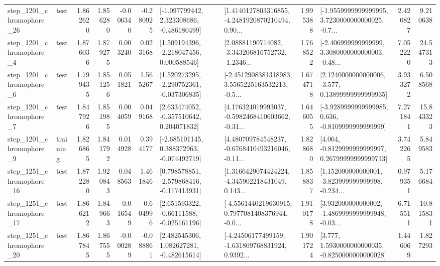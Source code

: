 \begin{tabular}{llrrrrllrlrr}
 step\_1201\_chromophore\_26 &      test &      1.862620 &    1.856280 &     -0.006340 & -0.280925 &   [-1.097799442, 2.323308686, -0.486180499] &  [1.4140127803316855, -4.2481920870210494, 0.90... &       1.995388 &  [-1.9559999999999995, 3.7230000000000025, -0.7... &            2.420827 &          9.210638 \\
  step\_1201\_chromophore\_4 &      test &      1.876036 &    1.879275 &      0.003240 &  0.023168 &    [1.509194396, -2.218047456, 0.000588546] &  [2.08881190714082, -3.343206816752732, -1.2346... &       1.768522 &  [-2.406999999999999, 3.3080000000000003, -0.48... &            7.052220 &         24.547313 \\
  step\_1201\_chromophore\_6 &      test &      1.799435 &    1.851256 &      0.051821 &  1.565267 &   [1.520273295, -2.290752361, -0.037306835] &  [-2.4512908381318983, 3.5565225163532213, -0.5... &       1.674718 &  [2.1240000000000006, -3.577, 0.13899999999999935] &            3.933272 &          6.508568 \\
  step\_1201\_chromophore\_7 &      test &      1.847926 &    1.851985 &      0.004059 &  0.049168 &    [2.633474052, -0.357510642, 0.204071832] &  [4.176324019993037, -0.5982468410603662, -0.31... &       1.646055 &  [-3.9289999999999985, 0.636, -0.8109999999999999] &            7.271841 &         15.843323 \\
  step\_1201\_chromophore\_9 &  training &      1.826865 &    1.841792 &      0.014928 &  0.394177 &   [-2.685101145, 0.388372963, -0.074492719] &  [4.480709784548237, -0.6768410493216046, -0.11... &       1.828680 &  [4.064, -0.8129999999999997, 0.26799999999999713] &            3.742265 &          5.849583 \\
 step\_1251\_chromophore\_16 &      test &      1.872280 &    1.920843 &      0.048563 &  1.461846 &   [0.798578851, -2.579868416, -0.117413931] &  [1.3166429074424224, -4.345902218431049, 0.143... &       1.858837 &  [1.152000000000001, -3.823999999999998, -0.234... &            0.979351 &          5.176684 \\
 step\_1251\_chromophore\_17 &      test &      1.866212 &    1.849663 &     -0.016549 & -0.604996 &    [2.651593322, -0.66111588, -0.025161196] &  [-4.5561440219630915, 0.7977081408376944, -0.0... &       1.910178 &  [3.932000000000002, -1.4869999999999948, -0.03... &            6.715511 &         10.815831 \\
 step\_1251\_chromophore\_20 &      test &      1.867845 &    1.867555 &     -0.000289 & -0.088861 &    [2.482545306, 1.082627281, -0.482615614] &  [-4.24506177499159, -1.631809768831924, 0.9392... &       1.901724 &   [3.777, 1.5930000000000035, -0.8250000000000028] &            1.446069 &          1.827293 \\

\end{tabular}
